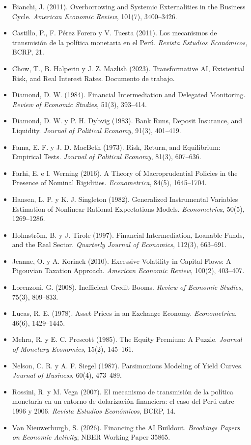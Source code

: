 \documentclass[11pt,a4paper]{article}
\begin{document}
{\small
\begin{itemize}[leftmargin=1.4em,itemsep=1pt,label={}]
\item Bianchi, J. (2011). Overborrowing and Systemic Externalities in the Business Cycle. \emph{American Economic Review}, 101(7), 3400--3426.
\item Castillo, P., F. Pérez Forero y V. Tuesta (2011). Los mecanismos de transmisión de la política monetaria en el Perú. \emph{Revista Estudios Económicos}, BCRP, 21.
\item Chow, T., B. Halperin y J. Z. Mazlish (2023). Transformative AI, Existential Risk, and Real Interest Rates. Documento de trabajo.
\item Diamond, D. W. (1984). Financial Intermediation and Delegated Monitoring. \emph{Review of Economic Studies}, 51(3), 393--414.
\item Diamond, D. W. y P. H. Dybvig (1983). Bank Runs, Deposit Insurance, and Liquidity. \emph{Journal of Political Economy}, 91(3), 401--419.
\item Fama, E. F. y J. D. MacBeth (1973). Risk, Return, and Equilibrium: Empirical Tests. \emph{Journal of Political Economy}, 81(3), 607--636.
\item Farhi, E. e I. Werning (2016). A Theory of Macroprudential Policies in the Presence of Nominal Rigidities. \emph{Econometrica}, 84(5), 1645--1704.
\item Hansen, L. P. y K. J. Singleton (1982). Generalized Instrumental Variables Estimation of Nonlinear Rational Expectations Models. \emph{Econometrica}, 50(5), 1269--1286.
\item Holmström, B. y J. Tirole (1997). Financial Intermediation, Loanable Funds, and the Real Sector. \emph{Quarterly Journal of Economics}, 112(3), 663--691.
\item Jeanne, O. y A. Korinek (2010). Excessive Volatility in Capital Flows: A Pigouvian Taxation Approach. \emph{American Economic Review}, 100(2), 403--407.
\item Lorenzoni, G. (2008). Inefficient Credit Booms. \emph{Review of Economic Studies}, 75(3), 809--833.
\item Lucas, R. E. (1978). Asset Prices in an Exchange Economy. \emph{Econometrica}, 46(6), 1429--1445.
\item Mehra, R. y E. C. Prescott (1985). The Equity Premium: A Puzzle. \emph{Journal of Monetary Economics}, 15(2), 145--161.
\item Nelson, C. R. y A. F. Siegel (1987). Parsimonious Modeling of Yield Curves. \emph{Journal of Business}, 60(4), 473--489.
\item Rossini, R. y M. Vega (2007). El mecanismo de transmisión de la política monetaria en un entorno de dolarización financiera: el caso del Perú entre 1996 y 2006. \emph{Revista Estudios Económicos}, BCRP, 14.
\item Van Nieuwerburgh, S. (2026). Financing the AI Buildout. \emph{Brookings Papers on Economic Activity}; NBER Working Paper 35865.
\end{itemize}
}
\end{document}
